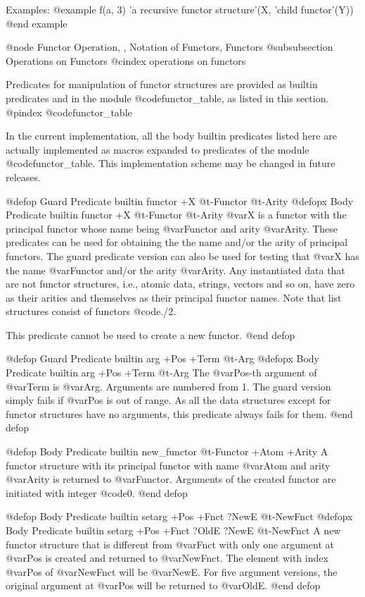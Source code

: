 {{Examples:
@example
f(a, 3)   'a recursive functor structure'(X, 'child functor'(Y))
@end example

@node Functor Operation,  , Notation of Functors, Functors
@subsubsection Operations on Functors
@cindex operations on functors

Predicates for manipulation of functor structures are provided as
builtin predicates and in the module @code{functor_table}, as listed in
this section.
@pindex @code{functor_table}

In the current implementation, all the body builtin predicates listed
here are actually implemented as macros expanded to predicates of the
module @code{functor_table}.  This implementation scheme may be changed
in future releases.

@defop {Guard Predicate} {builtin} functor +X @t{-}Functor @t{-}Arity
@defopx {Body Predicate} {builtin} functor +X @t{-}Functor @t{-}Arity
@var{X} is a functor with the principal functor whose name being
@var{Functor} and arity @var{Arity}.  These predicates can be used for
obtaining the the name and/or the arity of principal functors.  The
guard predicate version can also be used for testing that @var{X} has
the name @var{Functor} and/or the arity @var{Arity}.  Any instantiated
data that are not functor structures, i.e., atomic data, strings,
vectors and so on, have zero as their arities and themselves as their
principal functor names.  Note that list structures consist of functors
@code{./2}.

This predicate cannot be used to create a new functor.
@end defop

@defop {Guard Predicate} {builtin} arg +Pos +Term @t{-}Arg
@defopx {Body Predicate} {builtin} arg +Pos +Term @t{-}Arg
The @var{Pos}-th argument of @var{Term} is @var{Arg}.  Arguments are
numbered from 1.  The guard version simply fails if @var{Pos} is out of
range.  As all the data structures except for functor structures have no
arguments, this predicate always fails for them.
@end defop

@defop {Body Predicate} {builtin} new_functor @t{-}Functor +Atom +Arity
A functor structure with its principal functor with name @var{Atom} and
arity @var{Arity} is returned to @var{Functor}.  Arguments of the
created functor are initiated with integer @code{0}.
@end defop

@defop {Body Predicate} {builtin}  setarg +Pos +Fnct ?NewE @t{-}NewFnct
@defopx {Body Predicate} {builtin}  setarg +Pos +Fnct ?OldE ?NewE @t{-}NewFnct
A new functor structure that is different from @var{Fnct} with only one
argument at @var{Pos} is created and returned to @var{NewFnct}.  The
element with index @var{Pos} of @var{NewFnct} will be @var{NewE}.  For
five argument versions, the original argument at @var{Pos} will be
returned to @var{OldE}.
@end defop

}}
